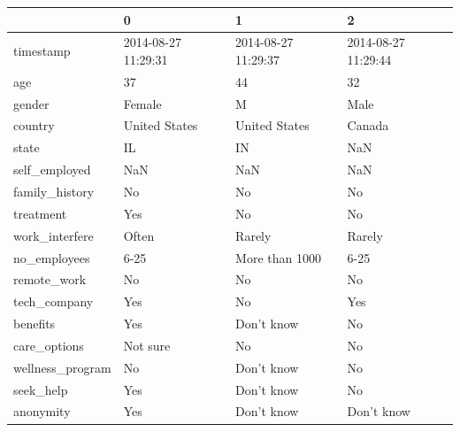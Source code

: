 \documentclass[conference]{IEEEtran}
\begin{document}
\begin{table}[h]
\centering
\begin{tabular}{|l|l|l|l|}
\hline
                            & 0                   & 1                   & 2                   \\ \hline
timestamp                   & 2014-08-27 11:29:31 & 2014-08-27 11:29:37 & 2014-08-27 11:29:44 \\ \hline
age                         & 37                  & 44                  & 32                  \\ \hline
gender                      & Female              & M                   & Male                \\ \hline
country                     & United States       & United States       & Canada              \\ \hline
state                       & IL                  & IN                  & NaN                 \\ \hline
self\_employed              & NaN                 & NaN                 & NaN                 \\ \hline
family\_history             & No                  & No                  & No                  \\ \hline
treatment                   & Yes                 & No                  & No                  \\ \hline
work\_interfere             & Often               & Rarely              & Rarely              \\ \hline
no\_employees               & 6-25                & More than 1000      & 6-25                \\ \hline
remote\_work                & No                  & No                  & No                  \\ \hline
tech\_company               & Yes                 & No                  & Yes                 \\ \hline
benefits                    & Yes                 & Don't know          & No                  \\ \hline
care\_options               & Not sure            & No                  & No                  \\ \hline
wellness\_program           & No                  & Don't know          & No                  \\ \hline
seek\_help                  & Yes                 & Don't know          & No                  \\ \hline
anonymity                   & Yes                 & Don't know          & Don't know          \\ \hline

\end{tabular}
\end{table}
\end{document}
